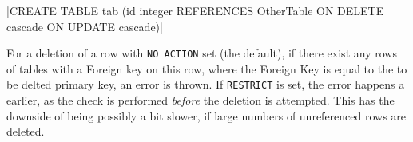 \inlineexample
{}|CREATE TABLE tab (id integer REFERENCES OtherTable ON DELETE cascade ON UPDATE cascade)|

\inlineintuition For a deletion of a row with \texttt{NO ACTION} set (the default), if there exist any rows of tables with a Foreign key on this row,
where the Foreign Key is equal to the to be delted primary key, an error is thrown.
If \texttt{RESTRICT} is set, the error happens a earlier, as the check is performed \textit{before} the deletion is attempted.
This has the downside of being possibly a bit slower, if large numbers of unreferenced rows are deleted.
